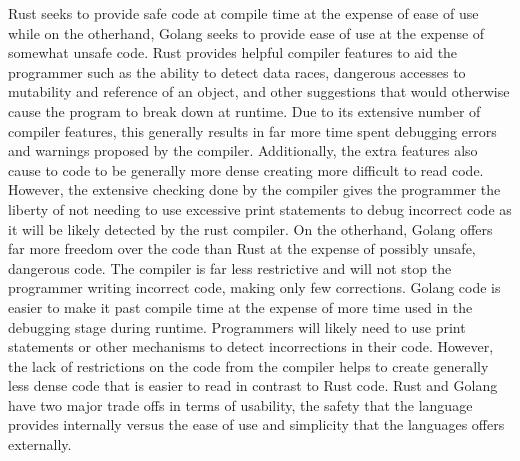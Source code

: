 \documentclass{article}
\begin{document}
\subtitle{Conclusion & Analysis}

\author{Aditya Saligrama and Andrew Shen}

\maketitle

Rust seeks to provide safe code at compile time at the expense of ease of use while on the otherhand, Golang seeks to provide ease of use at the expense of somewhat unsafe code. 
\newline
Rust provides helpful compiler features to aid the programmer such as the ability to detect data races, dangerous accesses to mutability and reference of an object, and other suggestions that would otherwise cause the program to break down at runtime. Due to its extensive number of compiler features, this generally results in far more time spent debugging errors and warnings proposed by the compiler. Additionally, the extra features also cause to code to be generally more dense creating more difficult to read code. However, the extensive checking done by the compiler gives the programmer the liberty of not needing to use excessive print statements to debug incorrect code as it will be likely detected by the rust compiler.
\newline
On the otherhand, Golang offers far more freedom over the code than Rust at the expense of possibly unsafe, dangerous code. The compiler is far less restrictive and will not stop the programmer writing incorrect code, making only few corrections. Golang code is easier to make it past compile time at the expense of more time used in the debugging stage during runtime. Programmers will likely need to use print statements or other mechanisms to detect incorrections in their code. However, the lack of restrictions on the code from the compiler helps to create generally less dense code that is easier to read in contrast to Rust code.
\newline
Rust and Golang have two major trade offs in terms of usability, the safety that the language provides internally versus the ease of use and simplicity that the languages offers externally.
\newline
\end{document}
